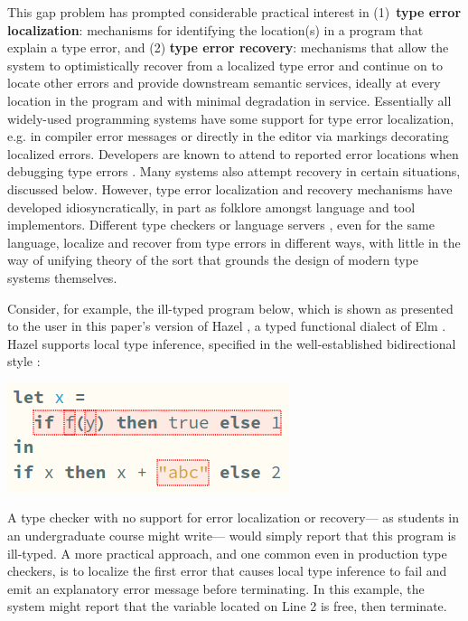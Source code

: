 This gap problem has prompted considerable practical interest in 
(1)~\textbf{type error localization}: mechanisms for identifying the location(s) in a program that explain a type error, and 
(2) \textbf{type error recovery}: mechanisms that allow the system to optimistically recover from a localized type error 
and continue on to locate other errors and provide downstream semantic services, 
ideally at every location in the program and with minimal degradation in service.
Essentially all widely-used programming systems have some support for type error localization, 
e.g. in compiler error messages 
or directly in the editor via markings decorating localized errors. Developers are known to attend to reported error locations when debugging type errors \cite{DBLP:journals/jfp/JoostenBH93}.
Many systems also attempt recovery in certain situations, discussed below. 
However, type error localization and recovery mechanisms have developed idiosyncratically, 
in part as folklore amongst language and tool implementors. 
Different type checkers or language servers \cite{barros2022editing,bour2018merlin}, even for the same language, localize and recover from type errors in different ways, 
with little in the way of unifying theory of the sort that grounds the design of modern type systems themselves.

Consider, for example, the ill-typed program below, which is shown as presented to the user in
this paper's version of Hazel \cite{hazel}, a typed functional dialect of Elm \cite{elm}. Hazel  
supports local type inference, specified in the well-established bidirectional style \cite{Localinf,HazelnutPOPL,BidirTyping}:
\vspace{-3px}
\begin{center}
    \includegraphics[scale=0.5]{images/hazel-intro-screenshot-v3.png}
\end{center}
\vspace{-3px}
A type checker with no support for error localization or recovery---%
as students in an undergraduate course might write---%
would simply report that this program is ill-typed. 
A more practical approach, and one common even in production type checkers, 
is to localize the first error that causes local type inference to fail and emit an explanatory error message before terminating.
In this example, the system might report that the variable  located on Line 2 is free, then terminate.

